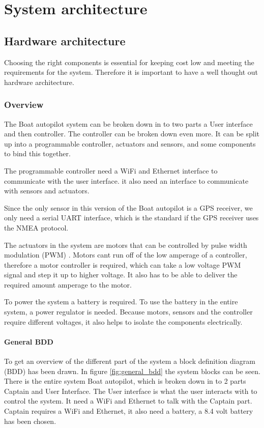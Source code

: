 \chapter{System architecture}
\label{sec:sys-architecture}


\section{Hardware architecture}
Choosing the right components is essential for keeping cost low and meeting the requirements for the system. Therefore it is important to have a well thought out hardware architecture. 

\subsection{Overview}
The Boat autopilot system can be broken down in to two parts a User interface and then controller.
The controller can be broken down even more. It can be split up into a programmable controller, actuators and sensors, and some components to bind this together.

The programmable controller need a WiFi and Ethernet interface to communicate with the user interface. it also need an interface to communicate with sensors and actuators. 

Since the only sensor in this version of the Boat autopilot is a GPS receiver, we only need a serial UART interface, which is the standard if the GPS receiver uses the NMEA protocol. 

The actuators in the system are motors that can be controlled by pulse width modulation (PWM) \cite{PWM}. Motors cant run off of the low amperage of a controller, therefore a motor controller is required, which can take a low voltage PWM signal and step it up to higher voltage. It also has to be able to deliver the required amount amperage to the motor. 

To power the system a battery is required. To use the battery in the entire system, a power regulator is needed. Because motors, sensors and the controller require different voltages, it also helps to isolate the components electrically.

\subsubsection{General BDD}

To get an overview of the different part of the system a block definition diagram (BDD) has been drawn.
In figure \ref{fig:general_bdd} the system blocks can be seen. There is the entire system Boat autopilot, which is broken down in to 2 parts Captain and User Interface. The User interface is what the user interacts with to control the system. It need a WiFi and Ethernet to talk with the Captain part. Captain requires a WiFi and Ethernet, it also need a battery, a 8.4 volt battery has been chosen. 

